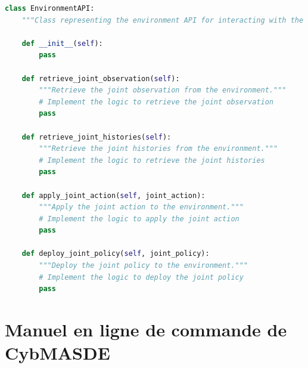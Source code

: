 \begin{lstlisting}[language=Python,basicstyle=\scriptsize, label={lst:cybmasde_environment_api}, caption={Extrait du fichier gabarit à utiliser pour implémenter l'API environnementale.}]
class EnvironmentAPI:
    """Class representing the environment API for interacting with the environment."""

    def __init__(self):
        pass

    def retrieve_joint_observation(self):
        """Retrieve the joint observation from the environment."""
        # Implement the logic to retrieve the joint observation
        pass

    def retrieve_joint_histories(self):
        """Retrieve the joint histories from the environment."""
        # Implement the logic to retrieve the joint histories
        pass

    def apply_joint_action(self, joint_action):
        """Apply the joint action to the environment."""
        # Implement the logic to apply the joint action
        pass

    def deploy_joint_policy(self, joint_policy):
        """Deploy the joint policy to the environment."""
        # Implement the logic to deploy the joint policy
        pass

\end{lstlisting}

\clearpage

\section{Manuel en ligne de commande de CybMASDE}\label{appendix:cybmasde-manual}

